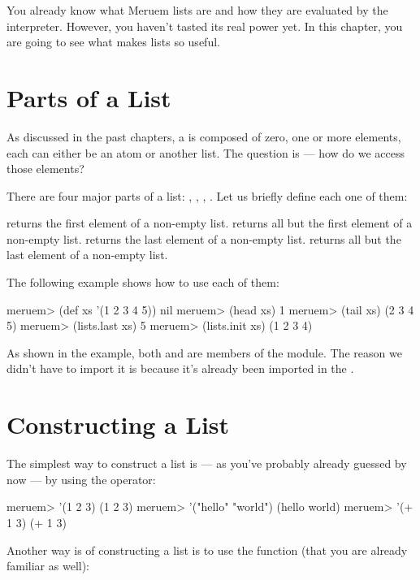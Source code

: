 You already know what Meruem lists are and how they are evaluated by the interpreter. However, you haven't tasted its real power yet. In this chapter, you are going to see what makes lists so useful.

\section{Parts of a List}
As discussed in the past chapters, a  is composed of zero, one or more elements, each can either be an atom or another list. The question is --- how do we access those elements? 

There are four major parts of a list: , , , . Let us briefly define each one of them:

\begin{description}
	 returns the first element of a non-empty list.
	 returns all but the first element of a non-empty list.
	 returns the last element of a non-empty list.
	 returns all but the last element of a non-empty list.
\end{description}

The following example shows how to use each of them:

\begin{REPL}
meruem> (def xs '(1 2 3 4 5))
nil
meruem> (head xs)
1
meruem> (tail xs)
(2 3 4 5)
meruem> (lists.last xs)
5
meruem> (lists.init xs)
(1 2 3 4)
\end{REPL}

As shown in the example, both  and  are members of the  module. The reason we didn't have to import it is because it's already been imported in the .

\section{Constructing a List}
The simplest way to construct a list is --- as you've probably already guessed by now --- by using the  operator:

\begin{REPL}
meruem> '(1 2 3)
(1 2 3)
meruem> '("hello" "world")
(hello world)
meruem> '(+ 1 3)
(+ 1 3)
\end{REPL}

Another way is of constructing a list is to use the  function (that you are already familiar as well):

